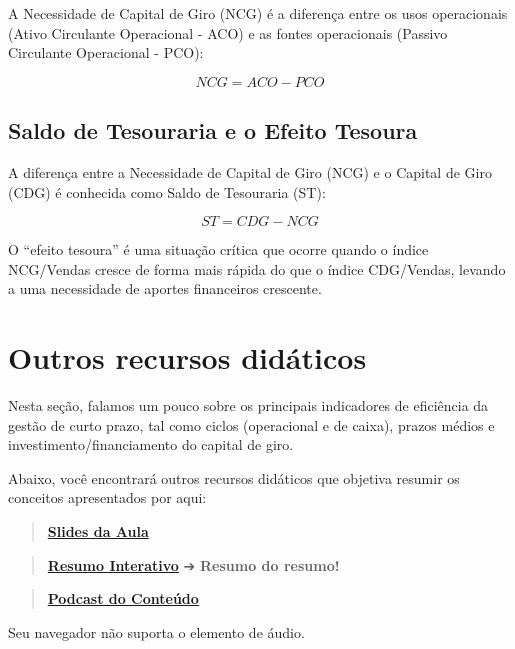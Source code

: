 \documentclass[
  a4paper,
]{book}
\begin{document}
A Necessidade de Capital de Giro (NCG) é a diferença entre os usos
operacionais (Ativo Circulante Operacional - ACO) e as fontes
operacionais (Passivo Circulante Operacional - PCO):

\[NCG = ACO - PCO\]

\subsection{Saldo de Tesouraria e o Efeito
Tesoura}\label{saldo-de-tesouraria-e-o-efeito-tesoura}

A diferença entre a Necessidade de Capital de Giro (NCG) e o Capital de
Giro (CDG) é conhecida como Saldo de Tesouraria (ST):

\[ST = CDG - NCG\]

O ``efeito tesoura'' é uma situação crítica que ocorre quando o índice
NCG/Vendas cresce de forma mais rápida do que o índice CDG/Vendas,
levando a uma necessidade de aportes financeiros crescente.

\section*{Outros recursos didáticos}\label{outros-recursos-diduxe1ticos}


Nesta seção, falamos um pouco sobre os principais indicadores de
eficiência da gestão de curto prazo, tal como ciclos (operacional e de
caixa), prazos médios e investimento/financiamento do capital de giro.

Abaixo, você encontrará outros recursos didáticos que objetiva resumir
os conceitos apresentados por aqui:

\begin{quote}
\href{./resources/giro-ppt.html}{\textbf{Slides da Aula}}
\end{quote}

\begin{quote}
\href{./resources/giro-interativo.html}{\textbf{Resumo Interativo}} ➔
\textbf{Resumo do resumo!} 🥱
\end{quote}

\begin{quote}
\href{resources/giro-podcast.mp3}{\textbf{Podcast do Conteúdo}}
\end{quote}

Seu navegador não suporta o elemento de áudio.
\end{document}
